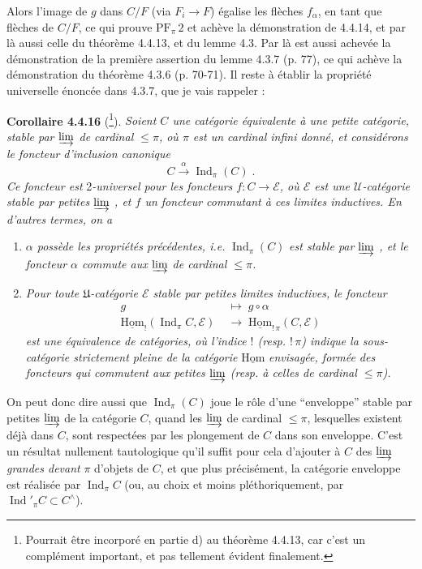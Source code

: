 \documentclass[11pt]{article}
\newcommand{\msp}[1]{\marginpar{\footnotesize [#1]}}
\newcommand{\uHom}{\underline{\mathrm{Hom}}}
\newcommand{\Ind}{\operatorname{Ind}}
\newcommand{\PF}{\mathrm{PF}}
\begin{document}
Alors l'image de $g$ dans $C/F$ (via $F_i\longrightarrow F$) égalise les flèches $f_\alpha$, en tant que flèches de $C/F$, ce qui prouve $\PF_\pi\,2$ et achève la démonstration de 4.4.14, et par là aussi celle du théorème 4.4.13, et du lemme 4.3. Par là est aussi achevée la démonstration de la première assertion du lemme
\msp{page 101}
4.3.7 (p. 77), ce qui achève la démonstration du théorème 4.3.6 (p. 70-71). Il reste à établir la propriété universelle énoncée dans 4.3.7, que je vais rappeler :

\textbf{Corollaire 4.4.16} (\footnote{Pourrait être incorporé en partie d) au théorème 4.4.13, car c'est un complément important, et pas tellement évident finalement.}). \textit{Soient $C$ une catégorie équivalente à une petite catégorie, stable par $\varinjlim$ de cardinal $\leqslant\pi$, où $\pi$ est un cardinal infini donné, et considérons le foncteur d'inclusion canonique}
\[
C\xrightarrow{\;\alpha\;}\Ind_\pi(C)\;. \tag*{(4.4.16.1)}
\]
\textit{Ce foncteur est} 2\textit{-universel pour les foncteurs $f:C\longrightarrow\mathcal{E}$, où $\mathcal{E}$ est une $\mathcal{U}$-catégorie stable par petites $\varinjlim$ , et $f$ un foncteur commutant à ces limites inductives. En d'autres termes, on a}
\begin{enumerate}
\item[\textit{1$^\circ$)}] \textit{$\alpha$ possède les propriétés précédentes, i.e.} $\Ind_\pi(C)$ \textit{est stable par $\varinjlim$ , et le foncteur $\alpha$ commute aux $\varinjlim$ de cardinal $\leqslant\pi$.}
\item[\textit{2$^\circ$)}] \textit{Pour toute $\mathfrak{U}$-catégorie $\mathcal{E}$ stable par petites limites inductives, le foncteur}
\[
\begin{aligned}
g\;&\longmapsto\;g\circ\alpha\\
\uHom_{!}(\Ind_\pi C,\mathcal{E})\;&\longrightarrow\;\uHom_{!\,\pi}(C,\mathcal{E})
\end{aligned}
\tag*{(4.4.16.2)}
\]
\textit{est une équivalence de catégories, où l'indice $!$ (resp. $!\,\pi$) indique la sous-catégorie strictement pleine de la catégorie} $\uHom$
\msp{page 102}
\textit{envisagée, formée des foncteurs qui commutent aux petites $\varinjlim$ (resp. à celles de cardinal $\leqslant\pi$).}
\end{enumerate}

On peut donc dire aussi que $\Ind_\pi(C)$ joue le rôle d'une “enveloppe” stable par petites $\varinjlim$ de la catégorie $C$, quand les $\varinjlim$ de cardinal $\leqslant\pi$, lesquelles existent déjà dans $C$, sont respectées par les plongement de $C$ dans son enveloppe. C'est un résultat nullement tautologique qu'il suffit pour cela d'ajouter à $C$ des $\varinjlim$ \textit{grandes devant} $\pi$ d'objets de $C$, et que plus précisément, la catégorie enveloppe est réalisée par $\Ind_\pi C$ (ou, au choix et moins pléthoriquement, par $\Ind'_\pi C\subset C^\wedge$). %
\end{document}
